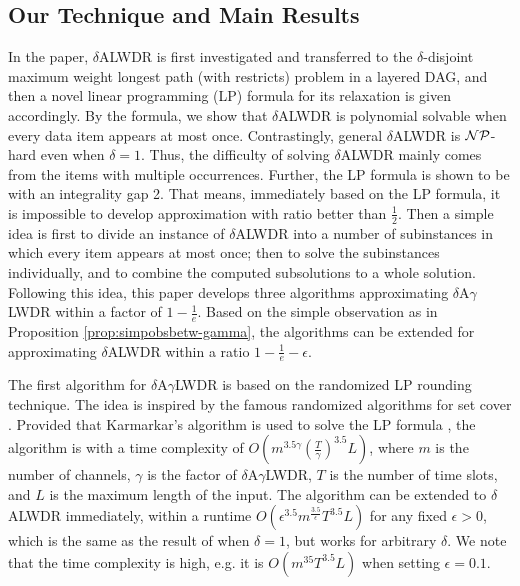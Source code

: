 \documentclass[11pt,english,onecolumn,draftcls]{IEEEtran}
\theoremstyle{plain}
\theoremstyle{plain}
\theoremstyle{plain}
\theoremstyle{plain}
\begin{document}
\subsection{Our Technique and Main Results}

In the paper, $\delta$ALWDR is first investigated and transferred
to the $\delta$-disjoint maximum weight longest path (with restricts)
problem in a layered DAG, and then a novel linear programming (LP)
formula for its relaxation is given accordingly. By the formula, we
show that $\delta$ALWDR is polynomial solvable when every data item
appears at most once. Contrastingly, general $\delta$ALWDR is ${\cal NP}$-hard
even when $\delta=1$. Thus, the difficulty of solving $\delta$ALWDR
mainly comes from the items with multiple occurrences. Further, the
LP formula is shown to be with an integrality gap 2. That means, immediately
based on the LP formula, it is impossible to develop approximation
with ratio better than $\frac{1}{2}$. Then a simple idea is first
to divide an instance of $\delta$ALWDR into a number of subinstances
in which every item appears at most once; then to solve the subinstances
individually, and to combine the computed subsolutions to a whole
solution. Following this idea, this paper develops three algorithms
approximating $\delta$A$\gamma$LWDR within a factor of $1-\frac{1}{e}$.
Based on the simple observation as in Proposition \ref{prop:simpobsbetw-gamma},
the algorithms can be extended for approximating $\delta$ALWDR within
a ratio $1-\frac{1}{e}-\epsilon$.

The first algorithm for $\delta$A$\gamma$LWDR is based on the randomized
LP rounding technique. The idea is inspired by the famous randomized
algorithms for set cover \cite{korte2002combinatorial}. Provided
that Karmarkar's algorithm is used to solve the LP formula \cite{korte2002combinatorial},
the algorithm is with a time complexity of $O(m^{3.5\gamma}\left(\frac{T}{\gamma}\right)^{3.5}L)$,
where $m$ is the number of channels, $\gamma$ is the factor of $\delta$A$\gamma$LWDR,
$T$ is the number of time slots, and $L$ is the maximum length of
the input. The algorithm can be extended to $\delta$ALWDR immediately,
within a runtime \textbf{$O(\epsilon^{3.5}m^{\frac{3.5}{\epsilon}}T^{3.5}L)$}
for any fixed $\epsilon>0$, which is the same as the result of \cite{lu2014data}
when $\delta=1$, but works for arbitrary $\delta$. We note that
the time complexity is high, e.g. it is $O(m^{35}T^{3.5}L)$ when
setting $\epsilon=0.1$.
\end{document}
